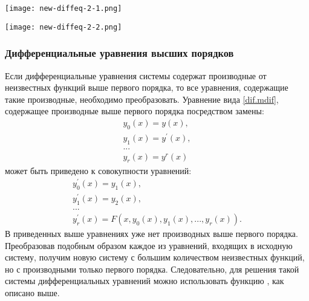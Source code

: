 
\begin{center}
	\texttt{[image: new-diffeq-2-1.png]}
\end{center}

\begin{center}
	\texttt{[image: new-diffeq-2-2.png]}
\end{center}

\subsubsection{Дифференциальные уравнения высших порядков}
Если дифференциальные уравнения системы содержат производные от неизвестных функций выше первого порядка, то все уравнения, содержащие такие производные, необходимо преобразовать. Уравнение вида \ref{dif.mdif}, содержащее производные выше первого порядка посредством замены:
\begin{equation}
\begin{gathered}
y_0(x)=y(x),\\ y_1(x)=y^{\prime}(x),\\  ... \\ y_r(x)=y^r(x)
\end{gathered}
\end{equation}
может быть приведено к совокупности уравнений:
\begin{equation}
\begin{gathered}
y_0^{\prime}(x)=y_1(x), \\ y_1^{\prime}(x)=y_2(x), \\ ... \\ y_r^{\prime}(x)=F(x,y_0(x),y_1(x), ... , y_r(x)).
\end{gathered}
\end{equation}
В приведенных выше уравнениях уже нет производных выше первого порядка. Преобразовав подобным образом каждое из уравнений, входящих в исходную систему, получим новую систему с большим количеством неизвестных функций, но с производными только первого порядка. Следовательно, для решения такой системы дифференциальных уравнений можно использовать функцию , как описано выше.

